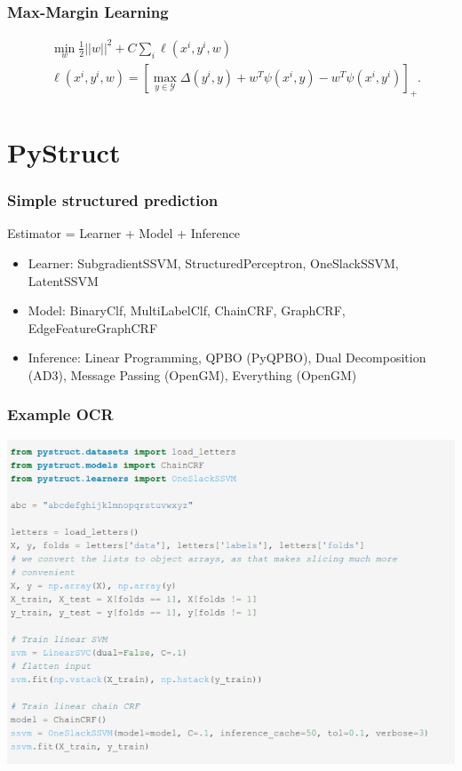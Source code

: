 \documentclass{beamer}
\newcommand{\hoch}[1]{^{#1}}
\begin{document}
    \begin{frame}
        \frametitle{Max-Margin Learning}
        \begin{align*}
            &\min_w \frac{1}{2} ||w||^2 + C \sum_i  \ell(x\hoch{i}, y\hoch{i}, w)\\
            &\ell(x\hoch{i}, y\hoch{i}, w) = [\max_{y \in \mathcal{Y}} \Delta(y\hoch{i}, y) + w^T \psi(x\hoch{i}, y) - w^T \psi(x\hoch{i}, y\hoch{i})]_+.
        \end{align*}
    \end{frame}


    \section{PyStruct}
    \begin{frame}
        \frametitle{Simple structured prediction}
        Estimator = Learner + Model + Inference\\

        \begin{itemize}
            \item<2-> Learner: SubgradientSSVM, StructuredPerceptron, OneSlackSSVM, LatentSSVM
            \item<2-> Model: BinaryClf, MultiLabelClf, ChainCRF, GraphCRF, EdgeFeatureGraphCRF
            \item<2-> Inference: Linear Programming, QPBO (PyQPBO), Dual Decomposition (AD3), Message Passing (OpenGM), Everything (OpenGM)
        \end{itemize}

    \end{frame}

    \begin{frame}
        \frametitle{Example OCR}
        \includegraphics[width=.7\linewidth]{images/code_letters}
    \end{frame}
\end{document}
